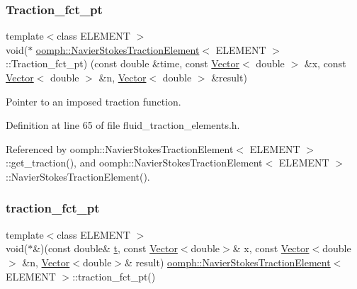 \mbox{\label{classoomph_1_1NavierStokesTractionElement_a487a7d11742c2e08c5d2c804df6d5eda}} 
\subsubsection{\texorpdfstring{Traction\+\_\+fct\+\_\+pt}{Traction\_fct\_pt}}
{\footnotesize\ttfamily template$<$class E\+L\+E\+M\+E\+NT $>$ \\
void($\ast$ \hyperlink{classoomph_1_1NavierStokesTractionElement}{oomph\+::\+Navier\+Stokes\+Traction\+Element}$<$ E\+L\+E\+M\+E\+NT $>$\+::Traction\+\_\+fct\+\_\+pt) (const double \&time, const \hyperlink{classoomph_1_1Vector}{Vector}$<$ double $>$ \&x, const \hyperlink{classoomph_1_1Vector}{Vector}$<$ double $>$ \&n, \hyperlink{classoomph_1_1Vector}{Vector}$<$ double $>$ \&result)\hspace{0.3cm}{\ttfamily [private]}}



Pointer to an imposed traction function. 



Definition at line 65 of file fluid\+\_\+traction\+\_\+elements.\+h.



Referenced by oomph\+::\+Navier\+Stokes\+Traction\+Element$<$ E\+L\+E\+M\+E\+N\+T $>$\+::get\+\_\+traction(), and oomph\+::\+Navier\+Stokes\+Traction\+Element$<$ E\+L\+E\+M\+E\+N\+T $>$\+::\+Navier\+Stokes\+Traction\+Element().

\mbox{\label{classoomph_1_1NavierStokesTractionElement_a97b29ab7568f8b93982fda56043449b6}} 
\subsubsection{\texorpdfstring{traction\+\_\+fct\+\_\+pt}{traction\_fct\_pt}}
{\footnotesize\ttfamily template$<$class E\+L\+E\+M\+E\+NT $>$ \\
void($\ast$\&)(const double\& \hyperlink{cfortran_8h_af6f0bd3dc13317f895c91323c25c2b8f}{t}, const \hyperlink{classoomph_1_1Vector}{Vector}$<$double$>$\& x, const \hyperlink{classoomph_1_1Vector}{Vector}$<$double$>$ \&n, \hyperlink{classoomph_1_1Vector}{Vector}$<$double$>$\& result) \hyperlink{classoomph_1_1NavierStokesTractionElement}{oomph\+::\+Navier\+Stokes\+Traction\+Element}$<$ E\+L\+E\+M\+E\+NT $>$\+::traction\+\_\+fct\+\_\+pt()\hspace{0.3cm}{\ttfamily [inline]}}



